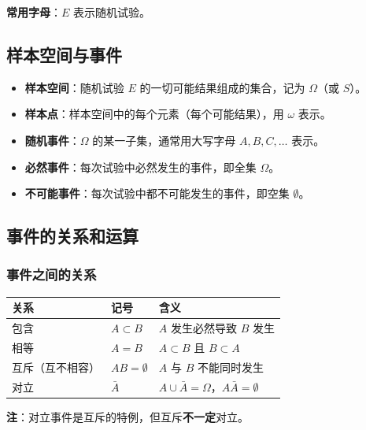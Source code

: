 \documentclass[12pt, a4paper]{article}
\begin{document}
\textbf{常用字母}：$E$ 表示随机试验。

\subsection{样本空间与事件}

\begin{tcolorbox}[defbox, title={定义：样本空间与样本点}]
    \begin{itemize}
        \item \textbf{样本空间}：随机试验 $E$ 的一切可能结果组成的集合，记为 $\Omega$（或 $S$）。
        \item \textbf{样本点}：样本空间中的每个元素（每个可能结果），用 $\omega$ 表示。
        \item \textbf{随机事件}：$\Omega$ 的某一子集，通常用大写字母 $A, B, C, \ldots$ 表示。
        \item \textbf{必然事件}：每次试验中必然发生的事件，即全集 $\Omega$。
        \item \textbf{不可能事件}：每次试验中都不可能发生的事件，即空集 $\emptyset$。
    \end{itemize}
\end{tcolorbox}

\subsection{事件的关系和运算}

\subsubsection{事件之间的关系}

\begin{tabular}{@{}lll@{}}
    \toprule
    关系       & 记号               & 含义                                           \\
    \midrule
    包含       & $A \subset B$    & $A$ 发生必然导致 $B$ 发生                            \\
    相等       & $A = B$          & $A \subset B$ 且 $B \subset A$                \\
    互斥（互不相容） & $AB = \emptyset$ & $A$ 与 $B$ 不能同时发生                             \\
    对立       & $\bar{A}$        & $A \cup \bar{A}=\Omega$，$A\bar{A}=\emptyset$ \\
    \bottomrule
\end{tabular}

\vspace{6pt}
\textbf{注}：对立事件是互斥的特例，但互斥\textbf{不一定}对立。
\end{document}
